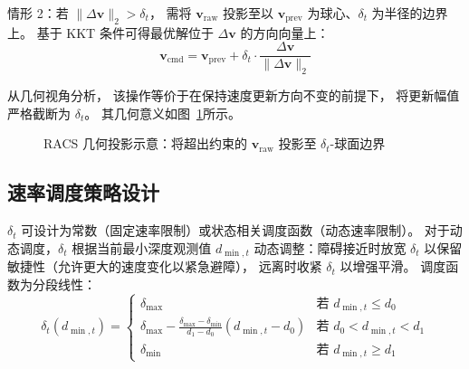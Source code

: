 情形 2：若 $\|\Delta \mathbf{v}\|_2 > \delta_t$，
需将 $\mathbf{v}_{\text{raw}}$ 投影至以 $\mathbf{v}_{\text{prev}}$ 为球心、$\delta_t$ 为半径的边界上。
基于 KKT 条件可得最优解位于 $\Delta \mathbf{v}$ 的方向向量上：
\begin{equation}
  \mathbf{v}_{\text{cmd}} = \mathbf{v}_{\text{prev}} + \delta_t \cdot \frac{\Delta \mathbf{v}}{\|\Delta \mathbf{v}\|_2}
  \label{eq:racs_proj}
\end{equation}

从几何视角分析，
该操作等价于在保持速度更新方向不变的前提下，
将更新幅值严格截断为 $\delta_t$。
其几何意义如图~\ref{fig:racs_projection}所示。

\begin{figure}[htbp]
\centering
{}
\caption{RACS 几何投影示意：将超出约束的 $\mathbf{v}_{\text{raw}}$ 投影至 $\delta_t$-球面边界}
\label{fig:racs_projection}
\end{figure}

\subsection{速率调度策略设计}

$\delta_t$ 可设计为常数（固定速率限制）或状态相关调度函数（动态速率限制）。
对于动态调度，$\delta_t$ 根据当前最小深度观测值 $d_{\min,t}$ 动态调整：障碍接近时放宽 $\delta_t$ 以保留敏捷性（允许更大的速度变化以紧急避障），
远离时收紧 $\delta_t$ 以增强平滑。
调度函数为分段线性：
\begin{equation}
  \delta_t(d_{\min,t}) = \begin{cases}
    \delta_{\max} & \text{若 } d_{\min,t} \leq d_0 \\
    \delta_{\max} - \frac{\delta_{\max} - \delta_{\min}}{d_1 - d_0}(d_{\min,t} - d_0) & \text{若 } d_0 < d_{\min,t} < d_1 \\
    \delta_{\min} & \text{若 } d_{\min,t} \geq d_1
  \end{cases}
  \label{eq:delta_schedule}
\end{equation}

